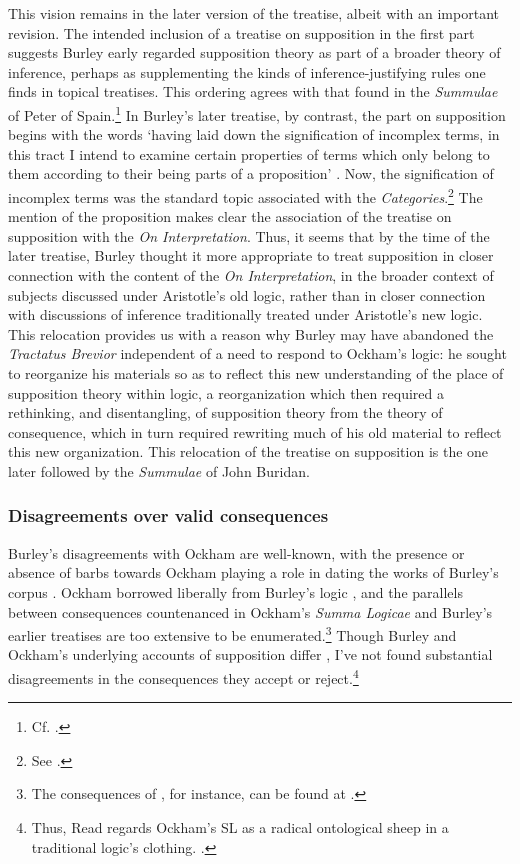 	This vision remains in the later version of the treatise, albeit with an important revision. The intended inclusion of a treatise on supposition in the first part suggests Burley early regarded supposition theory as part of a broader theory of inference, perhaps as supplementing the kinds of inference-justifying rules one finds in topical treatises. This ordering agrees with that found in the \textit{Summulae} of Peter of Spain.\footnote{Cf. \cite{Klima2003a}.} In Burley's later treatise, by contrast, the part on supposition begins with the words `having laid down the signification of incomplex terms, in this tract I intend to examine certain properties of terms which only belong to them according to their being parts of a proposition' \autocite[p. 1.3-6]{BurleyDPAL}. Now, the signification of incomplex terms was the standard topic associated with the \textit{Categories}.\footnote{See \cite[p. 65]{Burley2003}.} The mention of the proposition makes clear the association of the treatise on supposition with the \textit{On Interpretation}. Thus, it seems that by the time of the later treatise, Burley thought it more appropriate to treat supposition in closer connection with the content of the \textit{On Interpretation}, in the broader context of subjects discussed under Aristotle's old logic, rather than in closer connection with discussions of inference traditionally treated under Aristotle's new logic. This relocation provides us with a reason why Burley may have abandoned the \textit{Tractatus Brevior} independent of a need to respond to Ockham's logic: he sought to reorganize his materials so as to reflect this new understanding of the place of supposition theory within logic, a reorganization which then required a rethinking, and disentangling, of supposition theory from the theory of consequence, which in turn required rewriting much of his old material to reflect this new organization. This relocation of the treatise on supposition is the one later followed by the \textit{Summulae} of John Buridan.
	
	\subsubsection{Disagreements over valid consequences}
	Burley's disagreements with Ockham are well-known, with the presence or absence of barbs towards Ockham playing a role in dating the works of Burley's corpus \autocite{Ottman1999,Vittorini2013}. Ockham borrowed liberally from Burley's logic \autocite{Brown1972}, and the parallels between consequences countenanced in Ockham's \textit{Summa Logicae} and Burley's earlier treatises are too extensive to be enumerated.\footnote{The consequences of \cite[III-3.38, pp. 727-731]{OckhamSL}, for instance, can be found at \cite[par. 1, 4, 9, 14-15, 71-72, and 86-88]{Green-Pedersen1980b}.} Though Burley and Ockham's underlying accounts of supposition differ \autocite{Wagner1981}, I've not found substantial disagreements in the consequences they accept or reject.\footnote{Thus, Read regards Ockham's SL as a radical ontological sheep in a traditional logic's clothing. \cite[p. 276]{Read2007}.} 
	
